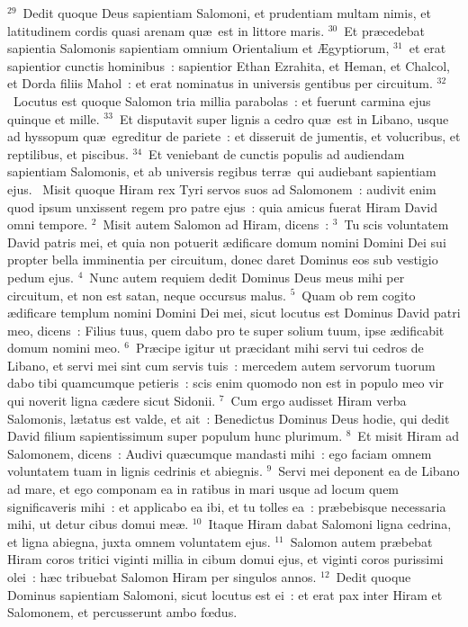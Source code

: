 ${}^{29}$~Dedit quoque Deus sapientiam Salomoni, et prudentiam multam nimis, et latitudinem cordis quasi arenam qu\ae\ est in littore maris.
${}^{30}$~Et pr\ae cedebat sapientia Salomonis sapientiam omnium Orientalium et \AE gyptiorum,
${}^{31}$~et erat sapientior cunctis hominibus~: sapientior Ethan Ezrahita, et Heman, et Chalcol, et Dorda filiis Mahol~: et erat nominatus in universis gentibus per circuitum.
${}^{32}$~Locutus est quoque Salomon tria millia parabolas~: et fuerunt carmina ejus quinque et mille.
${}^{33}$~Et disputavit super lignis a cedro qu\ae\ est in Libano, usque ad hyssopum qu\ae\ egreditur de pariete~: et disseruit de jumentis, et volucribus, et reptilibus, et piscibus.
${}^{34}$~Et veniebant de cunctis populis ad audiendam sapientiam Salomonis, et ab universis regibus terr\ae\ qui audiebant sapientiam ejus.
~\lettrine[lines=10,image=true,loversize=0.05,lraise=-0.03]{M}{}isit quoque Hiram rex Tyri servos suos ad Salomonem~: audivit enim quod ipsum unxissent regem pro patre ejus~: quia amicus fuerat Hiram David omni tempore.
${}^{2}$~Misit autem Salomon ad Hiram, dicens~:
${}^{3}$~Tu scis voluntatem David patris mei, et quia non potuerit \ae dificare domum nomini Domini Dei sui propter bella imminentia per circuitum, donec daret Dominus eos sub vestigio pedum ejus.
${}^{4}$~Nunc autem requiem dedit Dominus Deus meus mihi per circuitum, et non est satan, neque occursus malus.
${}^{5}$~Quam ob rem cogito \ae dificare templum nomini Domini Dei mei, sicut locutus est Dominus David patri meo, dicens~: Filius tuus, quem dabo pro te super solium tuum, ipse \ae dificabit domum nomini meo.
${}^{6}$~Pr\ae cipe igitur ut pr\ae cidant mihi servi tui cedros de Libano, et servi mei sint cum servis tuis~: mercedem autem servorum tuorum dabo tibi quamcumque petieris~: scis enim quomodo non est in populo meo vir qui noverit ligna c\ae dere sicut Sidonii.
${}^{7}$~Cum ergo audisset Hiram verba Salomonis, l\ae tatus est valde, et ait~: Benedictus Dominus Deus hodie, qui dedit David filium sapientissimum super populum hunc plurimum.
${}^{8}$~Et misit Hiram ad Salomonem, dicens~: Audivi qu\ae cumque mandasti mihi~: ego faciam omnem voluntatem tuam in lignis cedrinis et abiegnis.
${}^{9}$~Servi mei deponent ea de Libano ad mare, et ego componam ea in ratibus in mari usque ad locum quem significaveris mihi~: et applicabo ea ibi, et tu tolles ea~: pr\ae bebisque necessaria mihi, ut detur cibus domui me\ae .
${}^{10}$~Itaque Hiram dabat Salomoni ligna cedrina, et ligna abiegna, juxta omnem voluntatem ejus.
${}^{11}$~Salomon autem pr\ae bebat Hiram coros tritici viginti millia in cibum domui ejus, et viginti coros purissimi olei~: h\ae c tribuebat Salomon Hiram per singulos annos.
${}^{12}$~Dedit quoque Dominus sapientiam Salomoni, sicut locutus est ei~: et erat pax inter Hiram et Salomonem, et percusserunt ambo fœdus.


